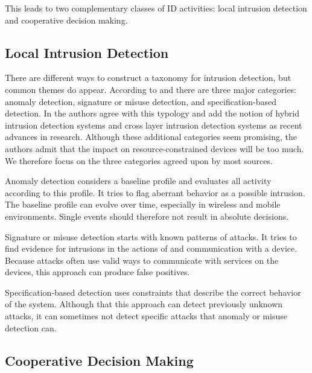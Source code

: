\documentclass[conference]{IEEEtran}
\begin{document}
This leads to two complementary classes of ID activities: local intrusion
detection and cooperative decision making.

\subsection{Local Intrusion Detection}
\label{detection}

There are different ways to construct a taxonomy for intrusion detection, but
common themes do appear. According to \cite{mishra2004intrusion} and
\cite{ioannis2007towards} there are three major categories: anomaly detection,
signature or misuse detection, and specification-based detection. In
\cite{alrajeh2013intrusion} the authors agree with this typology and add the
notion of hybrid intrusion detection systems and cross layer intrusion
detection systems as recent advances in research. Although these additional
categories seem promising, the authors admit that the impact on
resource-constrained devices will be too much. We therefore focus on the three
categories agreed upon by most sources.

\begin{LaTeXdescription}
  
  \item[Anomaly detection] considers a baseline profile and evaluates all
  activity according to this profile. It tries to flag aberrant behavior as a
  possible intrusion. The baseline profile can evolve over time, especially in
  wireless and mobile environments. Single events should therefore not result
  in absolute decisions.
  
  \item[Signature or misuse detection] starts with known patterns of attacks.
  It tries to find evidence for intrusions in the actions of and communication
  with a device. Because attacks often use valid ways to communicate with
  services on the devices, this approach can produce false positives.
  
  \item[Specification-based detection] uses constraints that describe the
  correct behavior of the system. Although that this approach can detect
  previously unknown attacks, it can sometimes not detect specific attacks that
  anomaly or misuse detection can.
  
\end{LaTeXdescription}

\subsection{Cooperative Decision Making}
\label{coorperative}
\end{document}

